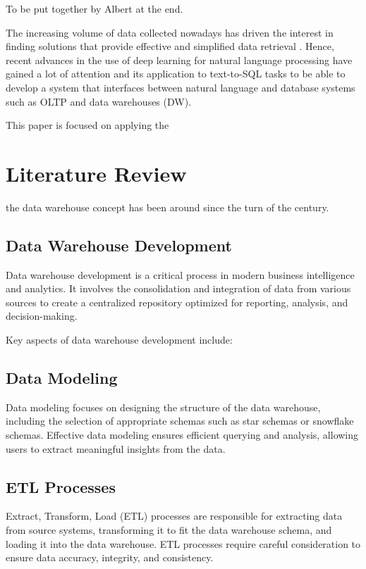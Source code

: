 \documentclass[conference]{IEEEtran}
\begin{document}
To be put together by Albert at the end.

The increasing volume of data collected nowadays has driven the interest in finding solutions that provide effective and simplified data retrieval  \cite{Wong2021ASystems}. Hence, recent advances in the use of deep learning for natural language processing have gained a lot of attention and its application to text-to-SQL tasks to be able to develop a system that interfaces between natural language and database systems such as OLTP and data warehouses (DW).

This paper is focused on applying the 

\section{Literature Review}

the data warehouse concept has been around since the turn of the century.

\subsection{Data Warehouse Development}

\setlength{\fboxrule}{2pt}
Data warehouse development is a critical process in modern business intelligence and analytics. It involves the consolidation and integration of data from various sources to create a centralized repository optimized for reporting, analysis, and decision-making.

Key aspects of data warehouse development include:

\subsection{Data Modeling} Data modeling focuses on designing the structure of the data warehouse, including the selection of appropriate schemas such as star schemas or snowflake schemas. Effective data modeling ensures efficient querying and analysis, allowing users to extract meaningful insights from the data.

\subsection{ETL Processes} Extract, Transform, Load (ETL) processes are responsible for extracting data from source systems, transforming it to fit the data warehouse schema, and loading it into the data warehouse. ETL processes require careful consideration to ensure data accuracy, integrity, and consistency.
\end{document}
